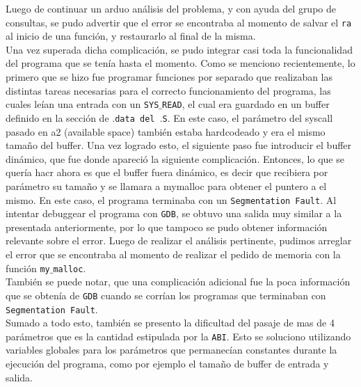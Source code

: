 \documentclass[a4paper, 10pt]{article}
\def\code#1{\texttt{#1}}
\newcommand\tab[1][0.5cm]{\hspace*{#1}}
\begin{document}
		Luego de continuar un arduo análisis del problema, y con ayuda del grupo de consultas, se pudo advertir que el error se encontraba al momento de salvar el \code{ra} al inicio de una función, y restaurarlo al final de la misma.
		\\
		\tab Una vez superada dicha complicación, se pudo integrar casi toda la funcionalidad del programa que se tenía hasta el momento. Como se menciono recientemente, lo primero que se hizo fue programar funciones por separado que realizaban las distintas tareas necesarias para el correcto funcionamiento del programa, las cuales leían una entrada con un \code{SYS$\_$READ}, el cual era guardado en un buffer definido en la sección de \code{$.$data del $.$S}. En este caso, el parámetro del syscall pasado en a2 (available space) también estaba hardcodeado y era el mismo tamaño del buffer. Una vez logrado esto, el siguiente paso fue introducir el buffer dinámico, que fue donde apareció la siguiente complicación. Entonces, lo que se quería hacr ahora es que el buffer fuera dinámico, es decir que recibiera por parámetro su tamaño y se llamara a mymalloc para obtener el puntero a el mismo. En este caso, el programa terminaba con un \code{Segmentation Fault}. Al intentar debuggear el programa con \code{GDB}, se obtuvo una salida muy similar a la presentada anteriormente, por lo que tampoco se pudo obtener información relevante sobre el error. Luego de realizar el análisis pertinente, pudimos arreglar el error que se encontraba al momento de realizar el pedido de memoria con la función \code{my$\_$malloc}.
		\\
		\tab También se puede notar, que una complicación adicional fue la poca información que se obtenía de \code{GDB} cuando se corrían los programas que terminaban con \code{Segmentation Fault}.
		\\
		\tab Sumado a todo esto, también se presento la dificultad del pasaje de mas de 4 parámetros que es la cantidad estipulada por la \code{ABI}. Esto se soluciono utilizando variables globales para los parámetros que permanecían constantes durante la ejecución del programa, como por ejemplo el tamaño de buffer de entrada y salida.
\end{document}
